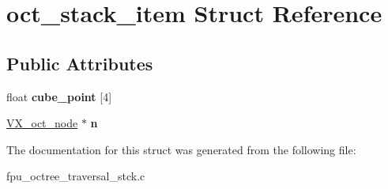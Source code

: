\hypertarget{structoct__stack__item}{\section{oct\-\_\-stack\-\_\-item Struct Reference}
\label{structoct__stack__item}
}
\subsection*{Public Attributes}
\begin{DoxyCompactItemize}
\item 
\hypertarget{structoct__stack__item_afb2cf71fa0999d11b42837adc0b1f668}{float {\bfseries cube\-\_\-point} \mbox{[}4\mbox{]}}\label{structoct__stack__item_afb2cf71fa0999d11b42837adc0b1f668}

\item 
\hypertarget{structoct__stack__item_a6719c147884d2a3d575f15aa5609eaf8}{\hyperlink{structVX__oct__node}{V\-X\-\_\-oct\-\_\-node} $\ast$ {\bfseries n}}\label{structoct__stack__item_a6719c147884d2a3d575f15aa5609eaf8}

\end{DoxyCompactItemize}


The documentation for this struct was generated from the following file\-:\begin{DoxyCompactItemize}
\item 
fpu\-\_\-octree\-\_\-traversal\-\_\-stck.\-c\end{DoxyCompactItemize}
